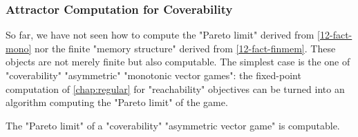 \subsubsection{Attractor Computation for Coverability}
\label{12-sub-attr}
So far, we have not seen how to compute the "Pareto limit" derived
from \cref{12-fact-mono} nor the finite "memory structure" derived
from \cref{12-fact-finmem}.  These objects are not merely finite but
also computable.  The simplest case is the one of "coverability"
"asymmetric" "monotonic vector games": the fixed-point computation of
\cref{chap:regular} for "reachability" objectives can be turned into
an algorithm computing the "Pareto limit" of the game.

\begin{fact}\label{12-pareto-cov}
  The "Pareto limit" of a "coverability" "asymmetric vector game" is
  computable.
\end{fact}
